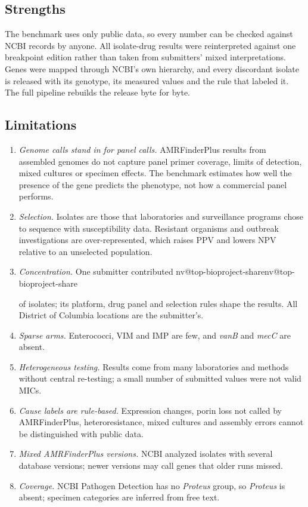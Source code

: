 \documentclass[10pt,twocolumn,letterpaper]{article}
\makeatletter
\newcommand{\nv}[1]{\ifcsname nv@#1\endcsname\csname nv@#1\endcsname\else
  \PackageError{numbers}{Unknown number key: #1}{Run build_assets.py}\fi}
\newcommand{\g}[1]{\textit{#1}}  %
\makeatother
\begin{document}
\subsection{Strengths}

The benchmark uses only public data, so every number can be checked against NCBI records by anyone. All isolate-drug
results were reinterpreted against one breakpoint edition rather than taken from submitters' mixed interpretations.
Genes were mapped through NCBI's own hierarchy, and every discordant isolate is released with its genotype, its measured
values and the rule that labeled it. The full pipeline rebuilds the release byte for byte.

\subsection{Limitations}\label{sec:limits}

\begin{enumerate}[leftmargin=*,itemsep=1pt,topsep=2pt]
\item \emph{Genome calls stand in for panel calls.} AMRFinderPlus results from assembled genomes do not capture panel
primer coverage, limits of detection, mixed cultures or specimen effects. The benchmark estimates how well the presence of
the gene predicts the phenotype, not how a commercial panel performs.
\item \emph{Selection.} Isolates are those that laboratories and surveillance programs chose to sequence with
susceptibility data. Resistant organisms and outbreak investigations are over-represented, which raises PPV and lowers
NPV relative to an unselected population.
\item \emph{Concentration.} One submitter contributed \nv{top-bioproject-share} of isolates; its platform, drug panel and
selection rules shape the results. All District of Columbia locations are the submitter's.
\item \emph{Sparse arms.} Enterococci, VIM and IMP are few, and \g{vanB} and \g{mecC} are absent.
\item \emph{Heterogeneous testing.} Results come from many laboratories and methods without central re-testing; a small
number of submitted values were not valid MICs.
\item \emph{Cause labels are rule-based.} Expression changes, porin loss not called by AMRFinderPlus, heteroresistance,
mixed cultures and assembly errors cannot be distinguished with public data.
\item \emph{Mixed AMRFinderPlus versions.} NCBI analyzed isolates with several database versions; newer versions may
call genes that older runs missed.
\item \emph{Coverage.} NCBI Pathogen Detection has no \textit{Proteus} group, so \textit{Proteus} is absent; specimen
categories are inferred from free text.
\end{enumerate}
\end{document}

